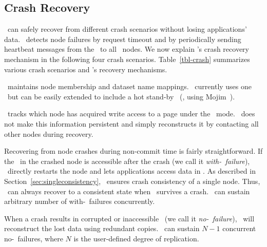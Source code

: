 \subsection{Crash Recovery}
\label{sec:recovery}

\hotpot\ can safely recover from different crash scenarios
without losing applications' data.
\hotpot\ detects node failures
by request timeout 
and by periodically sending heartbeat messages from 
the \cd\ to all \hotpot\ nodes.
We now explain \hotpot's crash recovery mechanism
in the following four crash scenarios.
Table~\ref{tbl-crash} summarizes various crash scenarios and \hotpot's recovery mechanisms.




\cd\ maintains node membership and dataset name mappings.
\hotpot\ currently uses one \cd\ but can be easily extended to 
include a hot stand-by \cd\ (\eg, using Mojim~\cite{Zhang15-Mojim}).

\master\ tracks which node has acquired write access to a page under the \mrsw\ mode.
\hotpot\ does not make this information persistent
and simply reconstructs it by contacting all other nodes during recovery.

Recovering from node crashes during non-commit time is fairly straightforward.
If the \nvm\ in the crashed node is accessible after the crash (we call it {\em with-\nvm\ failure}),
\hotpot\ directly restarts the node and
lets applications access data in \nvm.
As described in Section~\ref{sec:singleconsistency}, \hotpot\ ensures crash consistency of a single node.
Thus, \hotpot\ can always recover to a consistent state 
when \nvm\ survives a crash.
\hotpot\ can sustain arbitrary number of with-\nvm\ failures concurrently. 

When a crash results in corrupted or inaccessible \nvm\ (we call it {\em no-\nvm\ failure}),
\hotpot\ will reconstruct the lost data using redundant copies.
\hotpot\ can sustain $N-1$ concurrent no-\nvm\ failures, where $N$ is the user-defined degree of replication.

